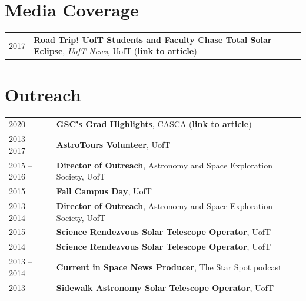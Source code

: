 \documentclass[10pt]{res} %
\begin{document}
\begin{resume}

\section{\Large Media Coverage}
\vspace{-5pt} %
\noindent\makebox[\linewidth]{\rule{\textwidth}{0.4pt}}
\vspace{-20pt} %

\begin{table}[h!]
\begin{tabularx}{\textwidth}{lX}
2017 & \textbf{Road Trip! UofT Students and Faculty Chase Total Solar Eclipse}, \textit{UofT News}, UofT (\href{https://www.utoronto.ca/news/road-trip-u-t-students-and-faculty-chase-total-solar-eclipse}{\textbf{link to article}})
\end{tabularx}
\end{table}


\newpage
\section{\Large Outreach}
\vspace{-5pt} %
\noindent\makebox[\linewidth]{\rule{\textwidth}{0.4pt}}
\vspace{-20pt} %

\begin{table}[h!]
\begin{tabularx}{\textwidth}{lX}
2020 & \textbf{GSC's Grad Highlights}, CASCA (\href{https://casca.ca/?page_id=14667}{\textbf{link to article}}) \\
2013 -- 2017 & \textbf{AstroTours Volunteer}, UofT \\
2015 -- 2016 & \textbf{Director of Outreach}, Astronomy and Space Exploration Society, UofT \\
2015 & \textbf{Fall Campus Day}, UofT \\
2013 -- 2014 & \textbf{Director of Outreach}, Astronomy and Space Exploration Society, UofT \\
2015 & \textbf{Science Rendezvous Solar Telescope Operator}, UofT \\
2014 & \textbf{Science Rendezvous Solar Telescope Operator}, UofT \\
2013 -- 2014 & \textbf{Current in Space News Producer}, The Star Spot podcast \\
2013 & \textbf{Sidewalk Astronomy Solar Telescope Operator}, UofT
\end{tabularx}
\end{table}



\end{resume}
\end{document}
